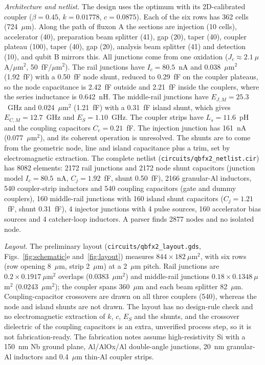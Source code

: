 \documentclass[10pt,twocolumn,letterpaper]{article}
\newcommand{\file}[1]{\texttt{#1}}
\begin{document}
\emph{Architecture and netlist.} The design uses the optimum with its 2D-calibrated coupler ($\beta=0.45$,
$k=0.01778$, $c=0.0875$). Each of the six rows has 362 cells (724~$\mu$m). Along the path of fluxon A the sections are
injection (10 cells), accelerator (40), preparation beam splitter (41), gap (20), taper (40), coupler plateau (100),
taper (40), gap (20), analysis beam splitter (41) and detection (10), and qubit B mirrors this. All junctions come
from one oxidation ($J_c\approx2.1~\mu$A/$\mu$m$^2$, 50~fF/$\mu$m$^2$). The rail junctions have $I_c=80.5$~nA and
0.038~$\mu$m$^2$ (1.92~fF) with a 0.50~fF node shunt, reduced to 0.29~fF on the coupler plateaus, so the node capacitance
is 2.42~fF outside and 2.21~fF inside the couplers, where the series inductance is 0.642~nH. The middle-rail junctions
have $E_{J,M}=25.3$~GHz and 0.024~$\mu$m$^2$ (1.21~fF) with a 0.31~fF island shunt, which gives $E_{C,M}=12.7$~GHz and
$E_S=1.10$~GHz. The coupler strips have $L_s=11.6$~pH and the coupling capacitors $C_c=0.21$~fF. The injection junction
has 161~nA (0.077~$\mu$m$^2$), and its coherent operation is unresolved. The shunts are to come from the geometric node,
line and island capacitance plus a trim, set by electromagnetic extraction. The complete netlist
(\file{circuits/\allowbreak{}qbfx2\_\allowbreak{}netlist.\allowbreak{}cir}) has 8082 elements: 2172 rail junctions and 2172 node shunt capacitors (junction
model $I_c=80.5$~nA, $C_j=1.92$~fF, shunt 0.50~fF), 2166 granular-Al inductors, 540 coupler-strip inductors and 540
coupling capacitors (gate and dummy couplers), 160 middle-rail junctions with 160 island shunt capacitors ($C_j=1.21$~fF,
shunt 0.31~fF), 4 injector junctions with 4 pulse sources, 160 accelerator bias sources and 4 catcher-loop inductors. A
parser finds 2877 nodes and no isolated node.

\emph{Layout.} The preliminary layout (\file{circuits/\allowbreak{}qbfx2\_\allowbreak{}layout.\allowbreak{}gds}, Figs.~\ref{fig:schematic}e
and~\ref{fig:layout}) measures $844\times182~\mu$m$^2$, with six rows (row opening 8~$\mu$m, strip 2~$\mu$m) at a
2~$\mu$m pitch. Rail junctions are $0.2\times0.1917~\mu$m$^2$ overlaps (0.0383~$\mu$m$^2$) and middle-rail junctions
$0.18\times0.1348~\mu$m$^2$ (0.0243~$\mu$m$^2$); the coupler spans 360~$\mu$m and each beam splitter 82~$\mu$m.
Coupling-capacitor crossovers are drawn on all three couplers (540), whereas the node and island shunts are not drawn.
The layout has no design-rule check and no electromagnetic extraction of $k$, $c$, $E_S$ and the shunts, and the
crossover dielectric of the coupling capacitors is an extra, unverified process step, so it is not fabrication-ready.
The fabrication notes assume high-resistivity Si with a 150~nm Nb ground plane, Al/AlOx/Al double-angle junctions,
20~nm granular-Al inductors and 0.4~$\mu$m thin-Al coupler strips.
\end{document}
